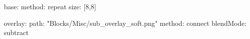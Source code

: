 base:
  method: repeat
  size: [8,8]

overlay:
  path: "Blocks/Misc/sub_overlay_soft.png"
  method: connect
  blendMode: subtract